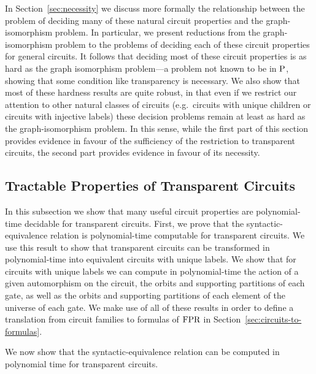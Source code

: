 \documentclass[../main/thesis.tex]{subfiles}
\begin{document}
In Section~\ref{sec:necessity} we discuss more formally the relationship between
the problem of deciding many of these natural circuit properties and the
graph-isomorphism problem. In particular, we present reductions from the
graph-isomorphism problem to the problems of deciding each of these circuit
properties for general circuits. It follows that deciding most of these circuit
properties is as hard as the graph isomorphism problem---a problem not known to
be in $\mathrm{P}$, showing that some condition like transparency is necessary. We also
show that most of these hardness results are quite robust, in that even if we
restrict our attention to other natural classes of circuits (e.g.\ circuits with
unique children or circuits with injective labels) these decision problems
remain at least as hard as the graph-isomorphism problem. In this sense, while
the first part of this section provides evidence in favour of the sufficiency of
the restriction to transparent circuits, the second part provides evidence in
favour of its necessity.

\subsection{Tractable Properties of Transparent Circuits}
In this subsection we show that many useful circuit properties are
polynomial-time decidable for transparent circuits. First, we prove that the
syntactic-equivalence relation is polynomial-time computable for transparent
circuits. We use this result to show that transparent circuits can be
transformed in polynomial-time into equivalent circuits with unique labels. We
show that for circuits with unique labels we can compute in polynomial-time the
action of a given automorphism on the circuit, the orbits and supporting
partitions of each gate, as well as the orbits and supporting partitions of each
element of the universe of each gate. We make use of all of these results in
order to define a translation from circuit families to formulas of $\text{\upshape FPR}$ in
Section~\ref{sec:circuits-to-formulas}.

We now show that the syntactic-equivalence relation can be computed in
polynomial time for transparent circuits.
\end{document}

